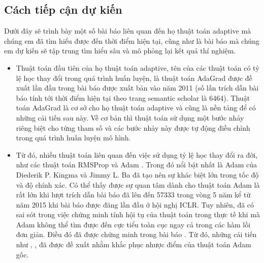 \documentclass{article}[14pt]
\begin{document}
{    \subsection{Cách tiếp cận dự kiến}
    
    
    
    Dưới đây sẽ trình bày một số bài báo liên quan đến họ thuật toán adaptive mà chúng em đã tìm hiểu được đến thời điểm hiện tại, cũng như là bài báo mà chúng em dự kiến sẽ tập trung tìm hiểu sâu và mô phỏng lại kết quả thí nghiệm.
    \begin{itemize}
        \item Thuật toán đầu tiên của họ thuật toán adaptive, tên của các thuật toán có tỷ lệ học thay đổi trong quá trình huấn luyện, là thuật toán AdaGrad được đề xuất lần đầu trong bài báo \cite{Duchi2011AdaptiveSM} được xuất bản vào năm 2011 (số lần trích dẫn bài báo tính tới thời điểm hiện tại theo trang semantic scholar là 6464). Thuật toán AdaGrad là cơ sở cho họ thuật toán adaptive và cũng là nền tảng để có những cải tiến sau này. Về cơ bản thì thuật toán sử dụng một bước nhảy riêng biệt cho từng tham số và các bước nhảy này được tự động điều chỉnh trong quá trình huấn luyện mô hình.
        \item Từ đó, nhiều thuật toán liên quan đến việc sử dụng tỷ lệ học thay đổi ra đời, như các thuật toán RMSProp \cite{Tieleman2012RMSProp} và Adam \cite{Kingma2015AdamAM}. Trong đó nổi bật nhất là Adam của Diederik P. Kingma và Jimmy L. Ba đã tạo nên sự khác biệt lớn trong tốc độ và độ chính xác. Có thể thấy được sự quan tâm dành cho thuật toán Adam là rất lớn khi lượt trích dẫn bài báo đã lên đến 57333 trong vòng 5 năm kể từ năm 2015 khi bài báo được đăng lần đầu ở hội nghị ICLR. Tuy nhiên, đã có sai sót trong việc chứng minh tính hội tụ của thuật toán trong thực tế khi mà Adam không thể tìm được đến cực tiểu toàn cục ngay cả trong các hàm lồi đơn giản. Điều đó đã được chứng minh trong bài báo \cite{Reddi2018OnTC}. Từ đó, những cải tiến như \cite{Reddi2018OnTC}, \cite{Dozat2016IncorporatingNM}, \cite{Zhang2017NormalizedDA} đã được đề xuất nhằm khắc phục nhược điểm của thuật toán Adam gốc.

\end{itemize}}
\end{document}
